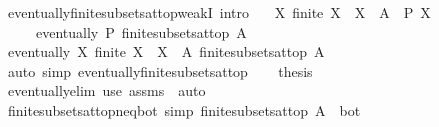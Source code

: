 \begin{isabellebody}
\isanewline
{}\isamarkupfalse%
\ eventually{\isacharunderscore}{\kern0pt}finite{\isacharunderscore}{\kern0pt}subsets{\isacharunderscore}{\kern0pt}at{\isacharunderscore}{\kern0pt}top{\isacharunderscore}{\kern0pt}weakI\ {\isacharbrackleft}{\kern0pt}intro{\isacharbrackright}{\kern0pt}{\isacharcolon}{\kern0pt}\isanewline
\ \ \ {\isachardoublequoteopen}{\isasymAnd}X{\isachardot}{\kern0pt}\ finite\ X\ {\isasymLongrightarrow}\ X\ {\isasymsubseteq}\ A\ {\isasymLongrightarrow}\ P\ X{\isachardoublequoteclose}\isanewline
\ \ \ \ \ {\isachardoublequoteopen}eventually\ P\ {\isacharparenleft}{\kern0pt}finite{\isacharunderscore}{\kern0pt}subsets{\isacharunderscore}{\kern0pt}at{\isacharunderscore}{\kern0pt}top\ A{\isacharparenright}{\kern0pt}{\isachardoublequoteclose}\isanewline
%
\isadelimproof
%
\endisadelimproof
%
\isatagproof
{}\isamarkupfalse%
\ {\isacharminus}{\kern0pt}\isanewline
\ \ \isamarkupfalse%
\ {\isachardoublequoteopen}eventually\ {\isacharparenleft}{\kern0pt}{\isasymlambda}X{\isachardot}{\kern0pt}\ finite\ X\ {\isasymand}\ X\ {\isasymsubseteq}\ A{\isacharparenright}{\kern0pt}\ {\isacharparenleft}{\kern0pt}finite{\isacharunderscore}{\kern0pt}subsets{\isacharunderscore}{\kern0pt}at{\isacharunderscore}{\kern0pt}top\ A{\isacharparenright}{\kern0pt}{\isachardoublequoteclose}\isanewline
\ \ \ \ \isamarkupfalse%
\ {\isacharparenleft}{\kern0pt}auto\ simp{\isacharcolon}{\kern0pt}\ eventually{\isacharunderscore}{\kern0pt}finite{\isacharunderscore}{\kern0pt}subsets{\isacharunderscore}{\kern0pt}at{\isacharunderscore}{\kern0pt}top{\isacharparenright}{\kern0pt}\isanewline
\ \ \isamarkupfalse%
\ {\isacharquery}{\kern0pt}thesis\ \isamarkupfalse%
\ eventually{\isacharunderscore}{\kern0pt}elim\ {\isacharparenleft}{\kern0pt}use\ assms\ \ auto{\isacharparenright}{\kern0pt}\isanewline
{}\isamarkupfalse%
%
\endisatagproof
{\isafoldproof}%
%
\isadelimproof
\isanewline
%
\endisadelimproof
\isanewline
{}\isamarkupfalse%
\ finite{\isacharunderscore}{\kern0pt}subsets{\isacharunderscore}{\kern0pt}at{\isacharunderscore}{\kern0pt}top{\isacharunderscore}{\kern0pt}neq{\isacharunderscore}{\kern0pt}bot\ {\isacharbrackleft}{\kern0pt}simp{\isacharbrackright}{\kern0pt}{\isacharcolon}{\kern0pt}\ {\isachardoublequoteopen}finite{\isacharunderscore}{\kern0pt}subsets{\isacharunderscore}{\kern0pt}at{\isacharunderscore}{\kern0pt}top\ A\ {\isasymnoteq}\ bot{\isachardoublequoteclose}\isanewline
%
\isadelimproof
%
\endisadelimproof

\end{isabellebody}
